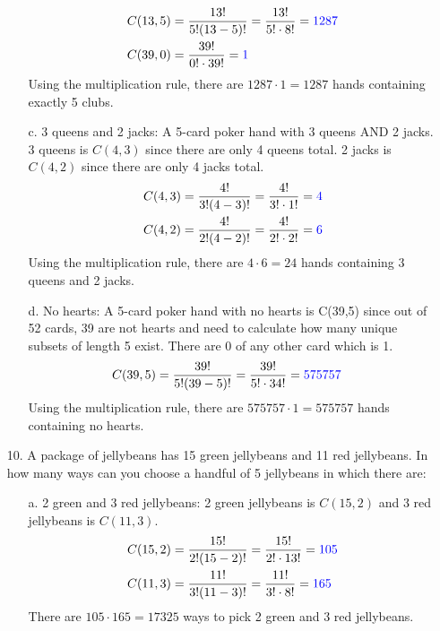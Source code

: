 \documentclass{article}
\begin{document}
\begin{itemize}
\begin{itemize}
        \begin{align}
            C(13,5)&=\frac{13!}{5!(13-5)!}=\frac{13!}{5!\cdot8!}={\color{blue}1287}\nonumber\\
            C(39,0)&=\frac{39!}{0!\cdot39!}={\color{blue}1}\nonumber
        \end{align}
        {\color{blue} Using the multiplication rule, there are $1287\cdot1=1287$ hands containing exactly 5 clubs.}
        \item[c.] 3 queens and 2 jacks: A 5-card poker hand with 3 queens AND 2 jacks. 3 queens is $C(4,3)$ since there are only 4 queens total.  2 jacks is $C(4,2)$ since there are only 4 jacks total.
        \begin{align}
            C(4,3)&=\frac{4!}{3!(4-3)!}=\frac{4!}{3!\cdot1!}={\color{blue}4}\nonumber\\
            C(4,2)&=\frac{4!}{2!(4-2)!}=\frac{4!}{2!\cdot2!}={\color{blue}6}\nonumber
        \end{align}
        {\color{blue} Using the multiplication rule, there are $4\cdot6=24$ hands containing 3 queens and 2 jacks.}
        \item[d.] No hearts: A 5-card poker hand with no hearts is C(39,5) since out of 52 cards, 39 are not hearts and need to calculate how many unique subsets of length 5 exist. There are 0 of any other card which is {\color{blue}1}.
        \begin{align}
            C(39,5)&=\frac{39!}{5!(39-5)!}=\frac{39!}{5!\cdot34!}={\color{blue}575757}\nonumber
        \end{align}
        {\color{blue} Using the multiplication rule, there are $575757\cdot1=575757$ hands containing no hearts.}
    \end{itemize}
    \item[10.] A package of jellybeans has 15 green jellybeans and 11 red jellybeans.  In how many ways can you choose a handful of 5 jellybeans in which there are:
    \begin{itemize}
        \item[a.] 2 green and 3 red jellybeans: 2 green jellybeans is $C(15,2)$ and 3 red jellybeans is $C(11,3)$.
        \begin{align}
            C(15,2)&=\frac{15!}{2!(15-2)!}=\frac{15!}{2!\cdot13!}={\color{blue}105}\nonumber\\
            C(11,3)&=\frac{11!}{3!(11-3)!}=\frac{11!}{3!\cdot8!}={\color{blue}165}\nonumber
        \end{align}
        {\color{blue} There are $105\cdot165=17325$ ways to pick 2 green and 3 red jellybeans.}

\end{itemize}
\end{itemize}
\end{document}
